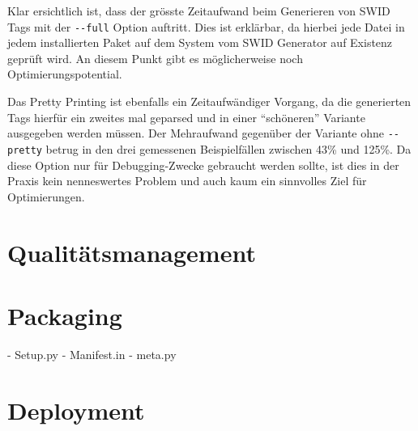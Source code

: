 Klar ersichtlich ist, dass der grösste Zeitaufwand beim Generieren von SWID Tags
mit der \texttt{-{}-full} Option auftritt. Dies ist erklärbar, da hierbei jede
Datei in jedem installierten Paket auf dem System vom SWID Generator auf
Existenz geprüft wird. An diesem Punkt gibt es möglicherweise noch
Optimierungspotential.

Das Pretty Printing ist ebenfalls ein Zeitaufwändiger Vorgang, da die
generierten Tags hierfür ein zweites mal geparsed und in einer
\enquote{schöneren} Variante ausgegeben werden müssen. Der Mehraufwand gegenüber
der Variante ohne \texttt{-{}-pretty} betrug in den drei gemessenen
Beispielfällen zwischen 43\% und 125\%. Da diese Option nur für Debugging-Zwecke
gebraucht werden sollte, ist dies in der Praxis kein nenneswertes Problem und
auch kaum ein sinnvolles Ziel für Optimierungen.




\section{Qualitätsmanagement}
\label{swidgenerator:architektur:qa}



\section{Packaging}

- Setup.py
- Manifest.in
- meta.py



\section{Deployment}
\label{swidgenerator:architektur:deployment}

